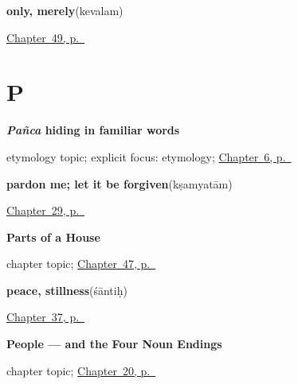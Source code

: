 \noindent\begin{minipage}[t]{\linewidth}
\raggedright
\textbf{only, merely}\enspace\emph{}\enspace(kevalam)\par
\footnotesize \hyperref[ch:sa-small-answers]{Chapter~49, p.~\pageref*{ch:sa-small-answers}}
\end{minipage}\par\smallskip

\section*{P}

\noindent\begin{minipage}[t]{\linewidth}
\raggedright
\textbf{\emph{Pañca} hiding in familiar words}\par
\footnotesize etymology topic; explicit focus: etymology; \hyperref[ch:numbers-one-to-five]{Chapter~6, p.~\pageref*{ch:numbers-one-to-five}}
\end{minipage}\par\smallskip

\noindent\begin{minipage}[t]{\linewidth}
\raggedright
\textbf{pardon me; let it be forgiven}\enspace\emph{}\enspace(kṣamyatām)\par
\footnotesize \hyperref[ch:sa-courtesy]{Chapter~29, p.~\pageref*{ch:sa-courtesy}}
\end{minipage}\par\smallskip

\noindent\begin{minipage}[t]{\linewidth}
\raggedright
\textbf{Parts of a House}\par
\footnotesize chapter topic; \hyperref[ch:sa-parts-of-a-house]{Chapter~47, p.~\pageref*{ch:sa-parts-of-a-house}}
\end{minipage}\par\smallskip

\noindent\begin{minipage}[t]{\linewidth}
\raggedright
\textbf{peace, stillness}\enspace\emph{}\enspace(śāntiḥ)\par
\footnotesize \hyperref[ch:sa-courtesy-more]{Chapter~37, p.~\pageref*{ch:sa-courtesy-more}}
\end{minipage}\par\smallskip

\noindent\begin{minipage}[t]{\linewidth}
\raggedright
\textbf{People --- and the Four Noun Endings}\par
\footnotesize chapter topic; \hyperref[ch:sa-people]{Chapter~20, p.~\pageref*{ch:sa-people}}
\end{minipage}\par\smallskip

